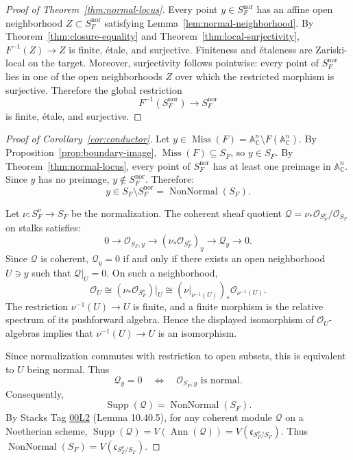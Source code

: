 \documentclass[11pt,reqno]{amsart}
\theoremstyle{plain}
\theoremstyle{definition}
\numberwithin{equation}{section}
\DeclareMathOperator{\Supp}{Supp}
\DeclareMathOperator{\Ann}{Ann}
\DeclareMathOperator{\NonNormal}{NonNormal}
\DeclareMathOperator{\Miss}{Miss}
\newcommand{\A}{\mathbb{A}}
\newcommand{\C}{\mathbb{C}}
\newcommand{\cO}{\mathcal{O}}
\newcommand{\cQ}{\mathcal{Q}}
\newcommand{\fc}{\mathfrak{c}}
\begin{document}
\begin{proof}[Proof of Theorem~\ref{thm:normal-locus}]
Every point $y \in S_F^{\mathrm{nor}}$ has an affine open neighborhood $Z \subset S_F^{\mathrm{nor}}$ satisfying Lemma~\ref{lem:normal-neighborhood}. By Theorem~\ref{thm:closure-equality} and Theorem~\ref{thm:local-surjectivity}, $F^{-1}(Z) \to Z$ is finite, \'{e}tale, and surjective. Finiteness and \'{e}taleness are Zariski-local on the target.  Moreover, surjectivity follows pointwise: every point of $S_F^{\mathrm{nor}}$ lies in one of the open neighborhoods $Z$ over which the restricted morphism is surjective. Therefore the global restriction
\[
F^{-1}(S_F^{\mathrm{nor}}) \longrightarrow S_F^{\mathrm{nor}}
\]
is finite, \'{e}tale, and surjective.
\end{proof}

\begin{proof}[Proof of Corollary~\ref{cor:conductor}]
Let $y \in \Miss(F) = \A^n_\C \setminus F(\A^n_\C)$. By Proposition~\ref{prop:boundary-image}, $\Miss(F) \subseteq S_F$, so $y \in S_F$. 
By Theorem~\ref{thm:normal-locus}, every point of $S_F^{\mathrm{nor}}$ has at least one preimage in $\A^n_\C$. Since $y$ has no preimage, $y \notin S_F^{\mathrm{nor}}$. Therefore:
\[
y \in S_F \setminus S_F^{\mathrm{nor}} = \NonNormal(S_F).
\]

Let $\nu: S_F^\nu \to S_F$ be the normalization. The coherent sheaf quotient $\cQ = \nu_* \cO_{S_F^\nu} / \cO_{S_F}$ on stalks satisfies:
\[
0 \longrightarrow \cO_{S_F, y} \longrightarrow (\nu_* \cO_{S_F^\nu})_y \longrightarrow \cQ_y \longrightarrow 0.
\]
Since $\mathcal Q$ is coherent, $\mathcal Q_y=0$ if and only if there exists an open neighborhood $U\ni y$ such that $\mathcal Q|_U=0$.  On such a neighborhood,
\[
\mathcal O_U \cong (\nu_*\mathcal O_{S_F^\nu})|_U \cong (\nu|_{\nu^{-1}(U)})_* \mathcal O_{\nu^{-1}(U)}.
\]
The restriction $\nu^{-1}(U) \to U$ is finite, and a finite morphism is the relative spectrum of its pushforward algebra.  Hence the displayed isomorphism of $\mathcal O_U$-algebras implies that $\nu^{-1}(U)\to U$ is an isomorphism.

Since normalization commutes with restriction to open subsets, this is equivalent to $U$ being normal.  Thus
\[
\mathcal Q_y=0 \quad\Longleftrightarrow\quad \mathcal O_{S_F,y}\text{ is normal}.
\]
Consequently,
\[
\Supp(\mathcal Q)=\NonNormal(S_F).
\]
By Stacks Tag \href{https://stacks.math.columbia.edu/tag/00L2}{00L2} (Lemma 10.40.5), for any coherent module $\cQ$ on a Noetherian scheme, $\Supp(\cQ) = V(\Ann(\cQ)) = V(\fc_{S_F^\nu / S_F})$. Thus $\NonNormal(S_F) = V(\fc_{S_F^\nu / S_F})$.
\end{proof}
\end{document}
